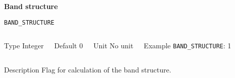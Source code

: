 

\begin{frame}[allowframebreaks,c]{} \label{BandStructure}

\begin{center}
\Huge \textbf{Band structure}
\end{center}

\end{frame}





\begin{frame}[allowframebreaks]{\texttt{BAND\_STRUCTURE}} \label{BAND_STRUCTURE}
\vspace*{-12pt}
\begin{columns}
\begin{block}{Type}
Integer
\end{block}

\begin{block}{Default}
0
\end{block}

\begin{block}{Unit}
No unit
\end{block}

\begin{block}{Example}
\texttt{BAND\_STRUCTURE}: 1
\end{block}
\end{columns}

\begin{block}{Description}
Flag for calculation of the band structure.
\end{block}


\end{frame}


